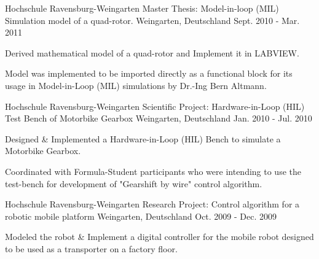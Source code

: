 

\begin{cventries}

  \cventry
    {Hochschule Ravensburg-Weingarten} %
    {Master Thesis: Model-in-loop (MIL) Simulation model of a quad-rotor.} %
    {Weingarten, Deutschland} %
    {Sept. 2010 - Mar. 2011} %
    {
      \begin{cvitems} %
        \item {Derived mathematical model of a quad-rotor and Implement it in LABVIEW.}
        \item {Model was implemented to be imported directly as a functional block for its usage in Model-in-Loop (MIL) simulations by Dr.-Ing Bern Altmann.}
      \end{cvitems}
    }
    
  \cventry
    {Hochschule Ravensburg-Weingarten} %
    {Scientific Project: Hardware-in-Loop (HIL) Test Bench of Motorbike Gearbox} %
    {Weingarten, Deutschland} %
    {Jan. 2010 - Jul. 2010} %
    {
      \begin{cvitems} %
      \item {Designed \& Implemented a Hardware-in-Loop (HIL) Bench to simulate a Motorbike Gearbox.}
      \item {Coordinated with Formula-Student participants who were intending to use the test-bench for development of "Gearshift by wire" control algorithm.}
      \end{cvitems}
    }
   
  \cventry
    {Hochschule Ravensburg-Weingarten} %
    {Research Project: Control algorithm for a robotic mobile platform} %
    {Weingarten, Deutschland} %
    {Oct. 2009 - Dec. 2009} %
    {
      \begin{cvitems} %
      	\item {Modeled the robot \& Implement a digital controller for the mobile robot designed to be used as a transporter on a factory floor.}
      \end{cvitems}
    }
    

\end{cventries}
